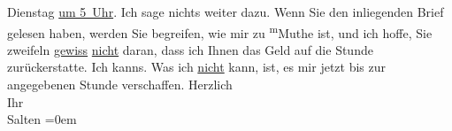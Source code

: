 \begin{ledgroupsized}[t]{13cm}
                  Dienstag{ }{\pb}\uline{um 5 Uhr}. Ich sage nichts weiter dazu. Wenn Sie den inliegenden Brief gelesen haben,
               werden Sie begreifen, wie mir zu \substVorne{}\textsuperscript{m}\substDazwischen{}M\substHinten{}uthe ist, und ich hoffe, Sie zweifeln \uline{gewiss}{ }\uline{nicht} daran, dass ich Ihnen das Geld auf die Stunde
               zurückerstatte. Ich kanns. Was ich \uline{nicht} kann, ist,
               es mir jetzt bis zur angegebenen Stunde verschaffen.\pend
           \pstart
           Herzlich {\\[\baselineskip]}Ihr {\\[\baselineskip]}\spacefill\mbox{Salten}\pend
           \leftskip=0em{}
         
         \endnumbering{}\end{ledgroupsized}  \newcommand{\dateiname}{L03168}\newcommand{\titel}{Felix Salten an Arthur Schnitzler, [zwischen 12.–29. 2. 1896]}\newcommand{\editorInnen}{Martin Anton Müller und Laura Untner}
      